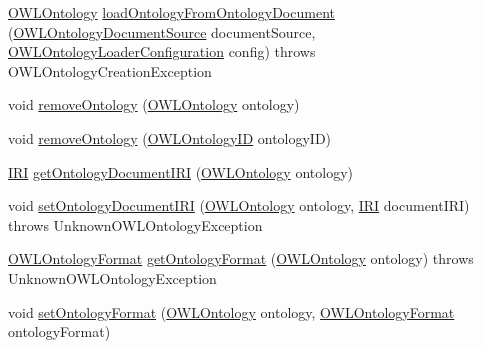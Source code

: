 \begin{DoxyCompactItemize}
\item 
\hyperlink{interfaceorg_1_1semanticweb_1_1owlapi_1_1model_1_1_o_w_l_ontology}{O\-W\-L\-Ontology} \hyperlink{interfaceorg_1_1semanticweb_1_1owlapi_1_1model_1_1_o_w_l_ontology_manager_a2591cdaf647b45bd68de3b6ad73727c3}{load\-Ontology\-From\-Ontology\-Document} (\hyperlink{interfaceorg_1_1semanticweb_1_1owlapi_1_1io_1_1_o_w_l_ontology_document_source}{O\-W\-L\-Ontology\-Document\-Source} document\-Source, \hyperlink{classorg_1_1semanticweb_1_1owlapi_1_1model_1_1_o_w_l_ontology_loader_configuration}{O\-W\-L\-Ontology\-Loader\-Configuration} config)  throws O\-W\-L\-Ontology\-Creation\-Exception
\item 
void \hyperlink{interfaceorg_1_1semanticweb_1_1owlapi_1_1model_1_1_o_w_l_ontology_manager_a5060fa629d02a5071f5041f6f0e4f494}{remove\-Ontology} (\hyperlink{interfaceorg_1_1semanticweb_1_1owlapi_1_1model_1_1_o_w_l_ontology}{O\-W\-L\-Ontology} ontology)
\item 
void \hyperlink{interfaceorg_1_1semanticweb_1_1owlapi_1_1model_1_1_o_w_l_ontology_manager_a2205ac9ee9b849fa93ca70f5a3f0713e}{remove\-Ontology} (\hyperlink{classorg_1_1semanticweb_1_1owlapi_1_1model_1_1_o_w_l_ontology_i_d}{O\-W\-L\-Ontology\-I\-D} ontology\-I\-D)
\item 
\hyperlink{classorg_1_1semanticweb_1_1owlapi_1_1model_1_1_i_r_i}{I\-R\-I} \hyperlink{interfaceorg_1_1semanticweb_1_1owlapi_1_1model_1_1_o_w_l_ontology_manager_acf535f5f6da0452f182aeacafea4a8ea}{get\-Ontology\-Document\-I\-R\-I} (\hyperlink{interfaceorg_1_1semanticweb_1_1owlapi_1_1model_1_1_o_w_l_ontology}{O\-W\-L\-Ontology} ontology)
\item 
void \hyperlink{interfaceorg_1_1semanticweb_1_1owlapi_1_1model_1_1_o_w_l_ontology_manager_a23cce9362d47c5dd41f07b8dbb5286e4}{set\-Ontology\-Document\-I\-R\-I} (\hyperlink{interfaceorg_1_1semanticweb_1_1owlapi_1_1model_1_1_o_w_l_ontology}{O\-W\-L\-Ontology} ontology, \hyperlink{classorg_1_1semanticweb_1_1owlapi_1_1model_1_1_i_r_i}{I\-R\-I} document\-I\-R\-I)  throws Unknown\-O\-W\-L\-Ontology\-Exception
\item 
\hyperlink{classorg_1_1semanticweb_1_1owlapi_1_1model_1_1_o_w_l_ontology_format}{O\-W\-L\-Ontology\-Format} \hyperlink{interfaceorg_1_1semanticweb_1_1owlapi_1_1model_1_1_o_w_l_ontology_manager_aed29b52a610c80473a1111e8861f2ccc}{get\-Ontology\-Format} (\hyperlink{interfaceorg_1_1semanticweb_1_1owlapi_1_1model_1_1_o_w_l_ontology}{O\-W\-L\-Ontology} ontology)  throws Unknown\-O\-W\-L\-Ontology\-Exception
\item 
void \hyperlink{interfaceorg_1_1semanticweb_1_1owlapi_1_1model_1_1_o_w_l_ontology_manager_a4f564c80049f6d39bc87475e3ed97d9b}{set\-Ontology\-Format} (\hyperlink{interfaceorg_1_1semanticweb_1_1owlapi_1_1model_1_1_o_w_l_ontology}{O\-W\-L\-Ontology} ontology, \hyperlink{classorg_1_1semanticweb_1_1owlapi_1_1model_1_1_o_w_l_ontology_format}{O\-W\-L\-Ontology\-Format} ontology\-Format)

\end{DoxyCompactItemize}
